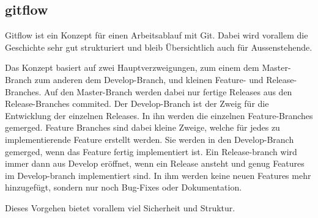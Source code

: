 \subsection{gitflow}
Gitflow ist ein Konzept für einen Arbeitsablauf mit Git. Dabei wird vorallem die Geschichte sehr gut strukturiert und bleib Übersichtlich auch für Aussenstehende.

\noindent Das Konzept basiert auf zwei Hauptverzweigungen, zum einem dem Master-Branch zum anderen dem Develop-Branch, und kleinen Feature- und Release-Branches. Auf den Master-Branch werden dabei nur fertige Releases aus den Release-Branches commited. Der Develop-Branch ist der Zweig für die Entwicklung der einzelnen Releases. In ihn werden die einzelnen Feature-Branches gemerged. Feature Branches sind dabei kleine Zweige, welche für jedes zu implementierende Feature erstellt werden. Sie werden in den Develop-Branch gemerged, wenn das Feature fertig implementiert ist. Ein Release-branch wird immer dann aus Develop eröffnet, wenn ein Release ansteht und genug Features im Develop-branch implementiert sind. In ihm werden keine neuen Features mehr hinzugefügt, sondern nur noch Bug-Fixes oder Dokumentation.

\noindent Dieses Vorgehen bietet vorallem viel Sicherheit und Struktur.
\cite{gitflow}	
